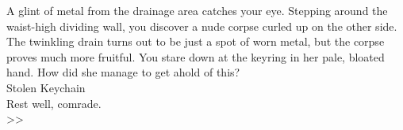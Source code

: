 A glint of metal from the drainage area catches your eye. Stepping around the waist-high dividing wall, you discover a nude corpse curled up on the other side.\\

The twinkling drain turns out to be just a spot of worn metal, but the corpse proves much more fruitful. You stare down at the keyring in her pale, bloated hand. How did she manage to get ahold of this?\\
 Stolen Keychain\\

Rest well, comrade.\\
>> 